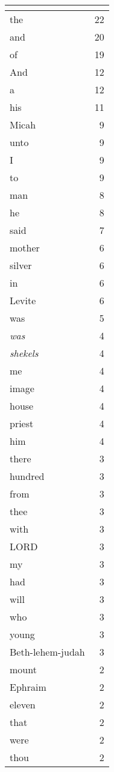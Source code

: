 \begin{center}
\begin{longtable}{l|r}
\hline \multicolumn{2}{c}{{ }} \\ \hline
\endfoot 
the & 22\\ \hline 
and & 20\\ \hline 
of & 19\\ \hline 
And & 12\\ \hline 
a & 12\\ \hline 
his & 11\\ \hline 
Micah & 9\\ \hline 
unto & 9\\ \hline 
I & 9\\ \hline 
to & 9\\ \hline 
man & 8\\ \hline 
he & 8\\ \hline 
said & 7\\ \hline 
mother & 6\\ \hline 
silver & 6\\ \hline 
in & 6\\ \hline 
Levite & 6\\ \hline 
was & 5\\ \hline 
\emph{was} & 4\\ \hline 
\emph{shekels} & 4\\ \hline 
me & 4\\ \hline 
image & 4\\ \hline 
house & 4\\ \hline 
priest & 4\\ \hline 
him & 4\\ \hline 
there & 3\\ \hline 
hundred & 3\\ \hline 
from & 3\\ \hline 
thee & 3\\ \hline 
with & 3\\ \hline 
LORD & 3\\ \hline 
my & 3\\ \hline 
had & 3\\ \hline 
will & 3\\ \hline 
who & 3\\ \hline 
young & 3\\ \hline 
Beth-lehem-judah & 3\\ \hline 
mount & 2\\ \hline 
Ephraim & 2\\ \hline 
eleven & 2\\ \hline 
that & 2\\ \hline 
were & 2\\ \hline 
thou & 2\\ \hline 

\end{longtable}
\end{center}
